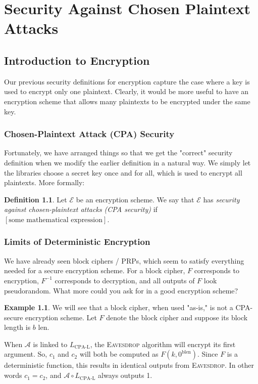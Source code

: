 \documentclass[12pt,openany]{book}
\theoremstyle{definition}
\newtheorem{definition}{Definition}[chapter]
\newtheorem{example}{Example}[chapter]
\begin{document}
	\newpage
	\chapter{Security Against Chosen Plaintext Attacks}
	\section{Introduction to Encryption}
	Our previous security definitions for encryption capture the case where a key is used to encrypt only one plaintext. Clearly, it would be more useful to have an encryption scheme that allows many plaintexts to be encrypted under the same key.
	
	\subsection{Chosen-Plaintext Attack (CPA) Security}
	Fortunately, we have arranged things so that we get the "correct" security definition when we modify the earlier definition in a natural way. We simply let the libraries choose a secret key once and for all, which is used to encrypt all plaintexts. More formally:
	
	\begin{definition}
		Let $\mathcal{E}$ be an encryption scheme. We say that $\mathcal{E}$ has \emph{security against chosen-plaintext attacks (CPA security)} if $[\text{some mathematical expression}]$.
	\end{definition}
	
	\subsection{Limits of Deterministic Encryption}
	We have already seen block ciphers / PRPs, which seem to satisfy everything needed for a secure encryption scheme. For a block cipher, $F$ corresponds to encryption, $F^{-1}$ corresponds to decryption, and all outputs of $F$ look pseudorandom. What more could you ask for in a good encryption scheme?
	
	\begin{example}
		We will see that a block cipher, when used "as-is," is not a CPA-secure encryption scheme. Let $F$ denote the block cipher and suppose its block length is $b$ len.
	\end{example}
	
	When \( \mathcal{A} \) is linked to \( L_{\text{CPA-L}} \), the
	\textsc{Eavesdrop} algorithm will encrypt its first argument. So, \( c_1 \)
	and \( c_2 \) will both be computed as \( F(k, 0^{\text{blen}}) \). Since \( F \) is a deterministic
	function, this results in identical outputs from \textsc{Eavesdrop}. In
	other words \( c_1 = c_2 \), and \( \mathcal{A} \circ L_{\text{CPA-L}} \) always outputs 1.
	
\end{document}
